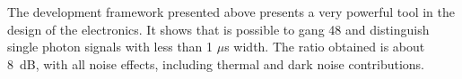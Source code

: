 The development framework presented above presents a very powerful tool in the design of the electronics. It shows that is possible to gang 48  and distinguish single photon signals with less than 1 $\mu$s width.
The  ratio obtained is about \SI{8}{dB}, with all noise effects, including thermal and dark noise contributions.







